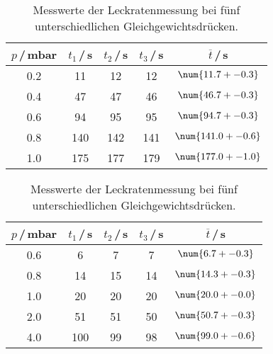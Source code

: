 \begin{table}[H]
  \caption{Messwerte der Leckratenmessung bei fünf unterschiedlichen Gleichgewichtsdrücken.}
  \begin{subtable}{0.45\textwidth}
    \begin{tabular}{c|c|c|c|c}\label{tab:Leck0.1Dreh}
      $p$\,/\,mbar & $t_1$\,/\,s & $t_2$\,/\,s & $t_3$\,/\,s & $\overline{t}$\,/\,s \\
      \hline
      0.2 & 11  & 12  & 12  & $\num{11.7 +- 0.3}$ \\
      0.4 & 47  & 47  & 46  & $\num{46.7 +- 0.3}$ \\
      0.6 & 94  & 95  & 95  & $\num{94.7 +- 0.3}$ \\
      0.8 & 140 & 142 & 141 & $\num{141.0 +- 0.6}$ \\
      1.0 & 175 & 177 & 179 & $\num{177.0 +- 1.0}$ \\
    \end{tabular}
  \end{subtable}\hfill
  \begin{subtable}{0.45\textwidth}
    \begin{tabular}{c|c|c|c|c}\label{tab:Leck0.4Dreh}
      $p$\,/\,mbar & $t_1$\,/\,s & $t_2$\,/\,s & $t_3$\,/\,s & $\overline{t}$\,/\,s \\
      \hline
      0.6 & 6   & 7  & 7  & $\num{6.7 +- 0.3}$ \\
      0.8 & 14  & 15 & 14 & $\num{14.3 +- 0.3}$ \\
      1.0 & 20  & 20 & 20 & $\num{20.0 +- 0.0}$ \\
      2.0 & 51  & 51 & 50 & $\num{50.7 +- 0.3}$ \\
      4.0 & 100 & 99 & 98 & $\num{99.0 +- 0.6}$ \\
    \end{tabular}
  \end{subtable}

  \vspace{1cm}


\end{table}
